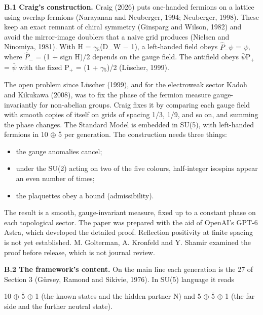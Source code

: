 \documentclass[
  11pt,
]{article}
\providecommand{\tightlist}{%
  \setlength{\itemsep}{0pt}\setlength{\parskip}{0pt}}
\begin{document}
\textbf{B.1 Craig's construction.} Craig (2026) puts one-handed fermions on a lattice using overlap fermions (Narayanan and Neuberger, 1994; Neuberger, 1998). These keep an exact remnant of chiral symmetry (Ginsparg and Wilson, 1982) and avoid the mirror-image doublers that a naive grid produces (Nielsen and Ninomiya, 1981). With H = \ensuremath{\gamma}\ensuremath{_{5}}(D\_W \ensuremath{-} 1), a left-handed field obeys \ensuremath{\hat{P}}\ensuremath{_{-}}\ensuremath{\psi} = \ensuremath{\psi}, where \ensuremath{\hat{P}}\ensuremath{_{-}} = (1 + sign H)/2 depends on the gauge field. The antifield obeys \ensuremath{\bar{\ensuremath{\psi}}}P\ensuremath{_{+}} = \ensuremath{\bar{\ensuremath{\psi}}} with the fixed P\ensuremath{_{+}} = (1 + \ensuremath{\gamma}\ensuremath{_{5}})/2 (Lüscher, 1999).

The open problem since Lüscher (1999), and for the electroweak sector Kadoh and Kikukawa (2008), was to fix the phase of the fermion measure gauge-invariantly for non-abelian groups. Craig fixes it by comparing each gauge field with smooth copies of itself on grids of spacing 1/3, 1/9, and so on, and summing the phase changes. The Standard Model is embedded in SU(5), with left-handed fermions in 10 \ensuremath{\oplus} \ensuremath{\bar{5}} per generation. The construction needs three things:

\begin{itemize}
\tightlist
\item
  the gauge anomalies cancel;
\item
  under the SU(2) acting on two of the five colours, half-integer isospins appear an even number of times;
\item
  the plaquettes obey a bound (admissibility).
\end{itemize}

The result is a smooth, gauge-invariant measure, fixed up to a constant phase on each topological sector. The paper was prepared with the aid of OpenAI's GPT-6 Astra, which developed the detailed proof. Reflection positivity at finite spacing is not yet established. M. Golterman, A. Kronfeld and Y. Shamir examined the proof before release, which is not journal review.

\textbf{B.2 The framework's content.} On the main line each generation is the 27 of Section 3 (Gürsey, Ramond and Sikivie, 1976). In SU(5) language it reads

10 \ensuremath{\oplus} \ensuremath{\bar{5}} \ensuremath{\oplus} 1 (the known states and the hidden partner N) and 5 \ensuremath{\oplus} \ensuremath{\bar{5}} \ensuremath{\oplus} 1 (the far side and the further neutral state).
\end{document}
